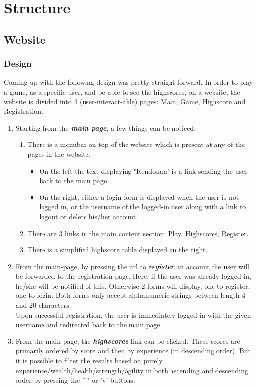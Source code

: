 \documentclass[12pt]{report}
\begin{document}
\section*{Structure}
\subsection*{Website}
\subsubsection{Design}
Coming up with the following design was pretty straight-forward. In order to play a game, as a specific user, and be able to see the highscores, on a website, the website is divided into 4 (user-interact-able) pages: Main, Game, Highscore and Registration.
\begin{enumerate}
\item Starting from the \emph{\textbf{main page}}, a few things can be noticed:
\begin{enumerate}
\item There is a menubar on top of the website which is present at any of the pages in the website.
\begin{itemize}
\item On the left the text displaying "Rendonan" is a link sending the user back to the main page.
\item On the right, either a login form is displayed when the user is not logged in, or the username of the logged-in user along with a link to logout or delete his/her account.
\end{itemize}
\item There are 3 links in the main content section: Play, Highscores, Register.
\item There is a simplified highscore table displayed on the right.
\end{enumerate}
\item From the main-page, by pressing the url to \emph{\textbf{register}} an account the user will be forwarded to the registration page. Here, if the user was already logged in, he/she will be notified of this. Otherwise 2 forms will display, one to register, one to login. Both forms only accept alphanumeric strings between length 4 and 20 characters.\\
Upon successful registration, the user is immediately logged in with the given username and redirected back to the main page.
\item From the main-page, the \emph{\textbf{highscores}} link can be clicked. These scores are primarily ordered by score and then by experience (in descending order). But it is possible to filter the results based on purely experience/wealth/health/strength/agility in both ascending and descending order by pressing the '\textasciicircum' or 'v' buttons.\\

\end{enumerate}
\end{document}
